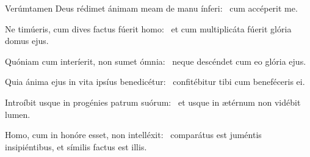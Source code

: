 \item Verúmtamen Deus rédimet ánimam meam de manu ínferi:~\psstar{} cum accéperit me.

\item Ne timúeris, cum dives factus fúerit homo:~\psstar{} et cum multiplicáta fúerit glória domus ejus.

\item Quóniam cum interíerit, non sumet ómnia:~\psstar{} neque descéndet cum eo glória ejus.

\item Quia ánima ejus in vita ipsíus benedicétur:~\psstar{} confitébitur tibi cum beneféceris ei.

\item Introíbit usque in progénies patrum suórum:~\psstar{} et usque in ætérnum non vidébit lumen.

\item Homo, cum in honóre esset, non intelléxit:~\psstar{} comparátus est juméntis insipiéntibus, et símilis factus est illis.